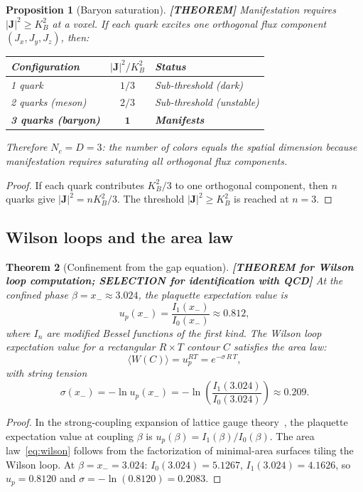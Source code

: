 \documentclass[11pt]{article}
\theoremstyle{tight}
\newtheorem{theorem}{Theorem}[section]
\newtheorem{proposition}[theorem]{Proposition}
\theoremstyle{plainroman}
\begin{document}
\begin{proposition}[Baryon saturation]\label{prop:baryon}
\textbf{[THEOREM]}
Manifestation requires $|\mathbf J|^2\ge K_B^2$ at a voxel.
If each quark excites one orthogonal flux component $(J_x,J_y,J_z)$, then:
\begin{center}
\renewcommand{\arraystretch}{1.15}
\begin{tabular}{lcl}
\toprule
\textbf{Configuration} & $|\mathbf J|^2/K_B^2$ & \textbf{Status} \\
\midrule
1 quark & $1/3$ & Sub-threshold (dark) \\
2 quarks (meson) & $2/3$ & Sub-threshold (unstable) \\
\textbf{3 quarks (baryon)} & $\mathbf{1}$ & \textbf{Manifests} \\
\bottomrule
\end{tabular}
\end{center}
Therefore $N_c=D=3$: the number of colors equals the spatial dimension because manifestation requires saturating all orthogonal flux components.
\end{proposition}
\begin{proof}
If each quark contributes $K_B^2/3$ to one orthogonal component, then $n$ quarks give $|\mathbf J|^2=nK_B^2/3$.
The threshold $|\mathbf J|^2\ge K_B^2$ is reached at $n=3$.
\end{proof}

\subsection{Wilson loops and the area law}

\begin{theorem}[Confinement from the gap equation]\label{thm:confinement}
\textbf{[THEOREM for Wilson loop computation; SELECTION for identification with QCD]}
At the confined phase $\beta=x_-\approx 3.024$, the plaquette expectation value is
\[
u_p(x_-)=\frac{I_1(x_-)}{I_0(x_-)}\approx 0.812,
\]
where $I_n$ are modified Bessel functions of the first kind.
The Wilson loop expectation value for a rectangular $R\times T$ contour $C$ satisfies the area law:
\begin{equation}\label{eq:wilson}
\langle W(C)\rangle=u_p^{RT}=e^{-\sigma\,R\,T},
\end{equation}
with string tension
\begin{equation}\label{eq:sigma}
\sigma(x_-)=-\ln u_p(x_-)=-\ln\!\left(\frac{I_1(3.024)}{I_0(3.024)}\right)\approx 0.209.
\end{equation}
\end{theorem}
\begin{proof}
In the strong-coupling expansion of lattice gauge theory~\cite{wilson,creutz}, the plaquette expectation value at coupling $\beta$ is $u_p(\beta)=I_1(\beta)/I_0(\beta)$.
The area law~\eqref{eq:wilson} follows from the factorization of minimal-area surfaces tiling the Wilson loop.
At $\beta=x_-=3.024$: $I_0(3.024)=5.1267$, $I_1(3.024)=4.1626$, so $u_p=0.8120$ and $\sigma=-\ln(0.8120)=0.2083$.
\end{proof}
\end{document}
